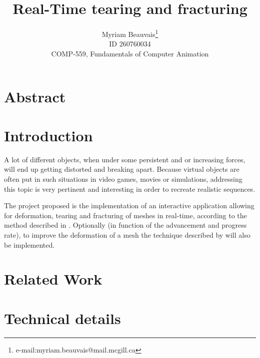 \documentclass[tog]{acmsiggraph}
\title{Real-Time tearing and fracturing}
\author{Myriam Beauvais\thanks{e-mail:myriam.beauvais@mail.mcgill.ca} \\ ID 260760034 \\COMP-559, Fundamentals of Computer Animation}
\begin{document}


\maketitle

\copyrightspace

\section{Abstract}

\section{Introduction}
A lot of different objects, when under some persistent and or increasing forces, will end up getting distorted and breaking apart. Because virtual objects are often put in such situations in video games, movies or simulations, addressing this topic is very pertinent and interesting in order to recreate realistic sequences.  

The project proposed is the implementation of an interactive application allowing for deformation, tearing and fracturing of meshes in real-time, according to the method described in \cite{Parker:2009:RTD}. Optionally (in function of the advancement and progress rate), to improve the deformation of a mesh the technique described by \cite{Rivers:2007:FFL} will also be implemented. 

\section{Related Work}

\section{Technical details}
\end{document}
